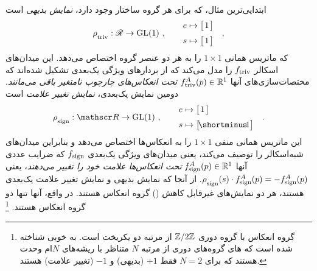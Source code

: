 ابتدایی‌ترین مثال، که برای هر گروه ساختار وجود دارد، \emph{نمایش بدیهی} است
\begin{align}
	\rho_{\overset{}{\textup{triv}}}: \mathscr{R} \to \operatorname{GL}(1)\ , \qquad 
	\begin{aligned}
		e &\mapsto \big[\mkern2mu 1 \mkern2mu\big] \\[2pt]
		s &\mapsto \big[\mkern2mu 1 \mkern2mu\big] \\
	\end{aligned}
	\quad ,
\end{align}
که ماتریس همانی ${1\!\times\!1}$ را به هر دو عنصر گروه اختصاص می‌دهد.
این میدان‌های اسکالر $f_{\textup{triv}}$ را مدل می‌کند که از بردارهای ویژگی یک‌بعدی تشکیل شده‌اند که مختصات‌سازی‌های آنها $f^A_{\textup{triv}}(p) \in \mathbb{R}^1$ \emph{تحت انعکاس‌های چارچوب نامتغیر باقی می‌مانند}.
دومین نمایش یک‌بعدی، \emph{نمایش تغییر علامت} است
\begin{align}
	\rhosign: \Flip \to \GL{1}\ , \qquad 
	\begin{aligned}
		e &\mapsto \big[\mkern2mu 1 \mkern2mu\big] \\[2pt]
		s &\mapsto \big[\! \shortminus\!1 \big]
	\end{aligned}
	\quad .
\end{align}
این ماتریس همانی منفی ${1\!\times\!1}$ را به انعکاس‌ها اختصاص می‌دهد و بنابراین میدان‌های شبه‌اسکالر را توصیف می‌کند، یعنی میدان‌های ویژگی یک‌بعدی $f_{\textup{sign}}$ که ضرایب عددی آنها $f^A_{\textup{sign}}(p) \in \mathbb{R}^1$ \emph{تحت انعکاس‌ها علامت خود را تغییر می‌دهند}، \mbox{یعنی} ${\rho_{\overset{}{\textup{sign}}}(s)\cdot f^A_{\textup{sign}}(p) = -f^A_{\textup{sign}}(p)}$.
از آنجا که نمایش بدیهی و نمایش تغییر علامت یک‌بعدی هستند، هر دو نمایش‌های غیرقابل کاهش () گروه انعکاس هستند.
در واقع، آنها تنها دو  گروه انعکاس هستند.%
\footnote{
	گروه انعکاس با گروه دوری $\mathbb{Z}/2\mathbb{Z}$ از مرتبه دو یکریخت است.
	به خوبی شناخته شده است که های گروه‌های دوری از مرتبه $N$ متناظر با ریشه‌های $N$ام وحدت هستند که برای $N=2$ فقط $+1$ (بدیهی) و $-1$ (تغییر علامت) هستند.
}

